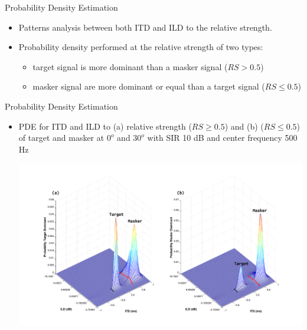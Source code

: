 \begin{frame}[t]{Probability Density Estimation}
\begin{itemize}
\item Patterns analysis between both ITD and ILD to the relative strength.
\item Probability density performed at the relative strength of two types:
	\begin{itemize}
	\item target signal is more dominant than a masker signal ($RS > 0.5$)
	\item masker signal are more dominant or equal than a target signal ($RS \leq 0.5$)
	\end{itemize}
\end{itemize}
\end{frame}

\begin{frame}[t]{Probability Density Estimation}
\begin{itemize}
\item{\scriptsize PDE for ITD and ILD to (a) relative strength ($RS \ge 0.5$) and (b) ($RS \leq 0.5$) of target and masker at $0^o$ and $30^o$ with SIR 10 dB and center frequency 500 Hz}
\begin{center}
	\includegraphics[scale=0.23]{../pict/pde-eps-converted-to.pdf}
\end{center}
\end{itemize}
\end{frame}
